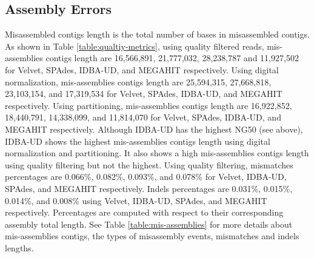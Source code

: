 \subsection*{Assembly Errors} 

Misassembled contigs length is the total number of bases in misassembled contigs.  As shown in Table \ref {table:qualtiy-metrics}, using quality filtered reads, mis-assemblies contigs length are 16,566,891, 21,777,032, 28,238,787 and 11,927,502 for Velvet, SPAdes, IDBA-UD, and MEGAHIT respectively. 
Using digital normalization,  mis-assemblies contigs length are 25,594,315, 27,668,818, 23,103,154, and 17,319,534 for Velvet, SPAdes, IDBA-UD, and MEGAHIT respectively.  Using partitioning,  mis-assemblies contigs length are 16,922,852, 18,440,791, 14,338,099, and 11,814,070 for Velvet, SPAdes, IDBA-UD, and MEGAHIT respectively. 
Although IDBA-UD has the highest NG50 (see above), IDBA-UD shows the highest mis-assemblies contigs length using digital normalization and partitioning. It also shows a high mis-assemblies contigs length using quality filtering but not the highest.
Using quality filtering, mismatches percentages are 0.066\%, 0.082\%, 0.093\%, and 0.078\% for Velvet, IDBA-UD, SPAdes, and MEGAHIT respectively. Indels percentages are 0.031\%, 0.015\%, 0.014\%, and 0.008\% using Velvet, IDBA-UD, SPAdes, and MEGAHIT respectively. Percentages are computed with respect to their corresponding assembly total length. See Table \ref{table:mis-assemblies}  for more details about mis-assemblies contigs, the types of misassembly events, mismatches and indels lengths.



   
